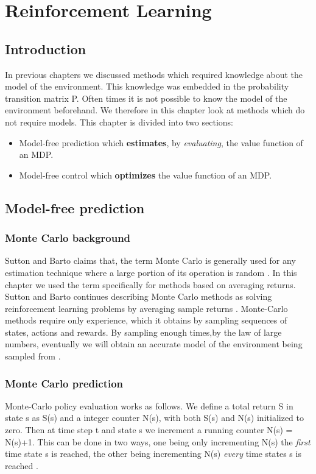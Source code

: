 \graphicspath{{RL/fig}}
\chapter{Reinforcement Learning}
\label{chap:RL}

\section{Introduction}
In previous chapters we discussed methods which required knowledge about the model of the environment. This knowledge was embedded in the probability transition matrix P. Often times it is not possible to know the model of the environment beforehand. We therefore in this chapter look at methods which do not require models.
This chapter is divided into two sections:
\begin{itemize}
	\item Model-free prediction which \textbf{estimates}, by \textit{evaluating}, the value function of an MDP. 
	\item Model-free control which \textbf{optimizes} the value function of an MDP.
\end{itemize}

\section{Model-free prediction}
\subsection{Monte Carlo background}
Sutton and Barto claims that, the term Monte Carlo is generally used for
any estimation technique where a large portion of its operation is random \cite{sutton_barto}. In this chapter we used the term specifically for methods based on averaging returns.
Sutton and Barto continues describing Monte Carlo methods as solving reinforcement learning problems by averaging sample returns \cite{sutton_barto}.
Monte-Carlo methods require only experience, which it obtains by sampling sequences of states, actions and rewards. By sampling enough times,by the law of large numbers, eventually we will obtain an accurate model of the environment being sampled from \cite{sutton_barto}.
\subsection{Monte Carlo prediction}
Monte-Carlo policy evaluation works as follows. We define a total return S in state s as S(s) and a integer counter N(s), with both S(s) and N(s) initialized to zero. 
Then at time step t and state s we increment a running counter N(s) = N(s)+1. This can be done in two ways, one being only incrementing N(s) the \textit{first} time state s is reached, the other being incrementing N(s) \textit{every} time states s is reached \cite{David_Silver}.

